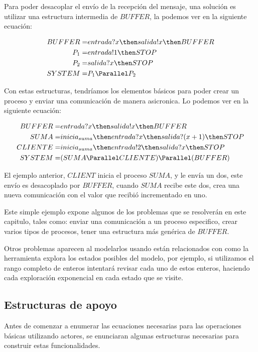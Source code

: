 Para poder desacoplar el envío de la recepción del mensaje, una solución es utilizar una estructura intermedia de $BUFFER$, la podemos ver en la siguiente ecuación:

\begin{align*}
BUFFER =& entrada?x \then salida!x \then BUFFER \\
P_1 =& entrada!1 \then STOP \\
P_2 =& salida?x \then STOP \\
SYSTEM =& P_1 \Parallel P_2 \\
\end{align*}

Con estas estructuras, tendríamos los elementos básicos para poder crear un proceso y enviar una comunicación de manera asicronica. Lo podemos ver en la siguiente ecuación:

\begin{align*}
BUFFER =& entrada?x \then salida!x \then BUFFER\\
SUMA =& inicia_{suma} \then entrada?x \then salida?(x + 1) \then STOP \\
CLIENTE =& inicia_{suma}\then entrada!2 \then salida?x \then STOP \\
SYSTEM =& (SUMA \Parallel CLIENTE) \Parallel (BUFFER)\\
\end{align*}

El ejemplo anterior, $CLIENT$ inicia el proceso $SUMA$, y le envía un dos, este envío es desacoplado por $BUFFER$, cuando $SUMA$ recibe este dos, crea una nueva comunicación con el valor que recibió incrementado en uno.

Este simple ejemplo expone algunos de los problemas que se resolverán en este capitulo, tales como: enviar una comunicación a un proceso especifico, crear varios tipos de procesos, tener una estructura más genérica de $BUFFER$.

Otros problemas aparecen al modelarlos usando \FDR están relacionados con como la herramienta explora los estados posibles del modelo, por ejemplo, si utilizamos el rango completo de enteros intentará revisar cada uno de estos enteros, haciendo cada exploración exponencial en cada estado que se visite.

\subsection{Estructuras de apoyo}

Antes de comenzar a enumerar las ecuaciones necesarias para las operaciones básicas utilizando actores, se enunciaran algunas estructuras necesarias para construir estas funcionalidades.

